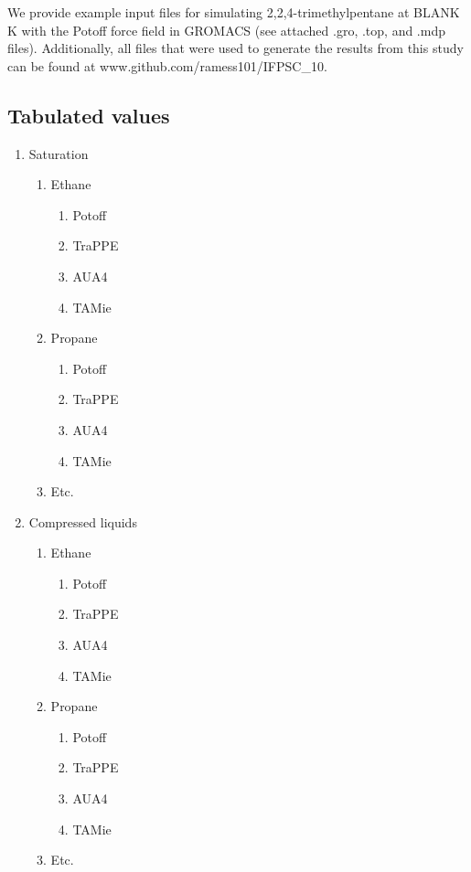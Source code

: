 \documentclass[preprint,review,12pt]{elsarticle}
\begin{document}
	We provide example input files for simulating 2,2,4-trimethylpentane at BLANK K with the Potoff force field in GROMACS (see attached .gro, .top, and .mdp files). Additionally, all files that were used to generate the results from this study can be found at www.github.com/ramess101/IFPSC\_10.
	
%	
	\subsection{Tabulated values}
	
	\begin{enumerate}
		\item Saturation
		\begin{enumerate}
			\item Ethane
			\begin{enumerate}
				\item Potoff
				\item TraPPE
				\item AUA4
				\item TAMie
			\end{enumerate}
			\item Propane
			\begin{enumerate}
				\item Potoff
				\item TraPPE
				\item AUA4
				\item TAMie
			\end{enumerate}
		    \item Etc.
		\end{enumerate}
		\item Compressed liquids
		\begin{enumerate}
			\item Ethane
			\begin{enumerate}
				\item Potoff
				\item TraPPE
				\item AUA4
				\item TAMie
			\end{enumerate}
			\item Propane
			\begin{enumerate}
				\item Potoff
				\item TraPPE
				\item AUA4
				\item TAMie
			\end{enumerate}
		    \item Etc.
		\end{enumerate}   
	\end{enumerate}
		
\end{document}
